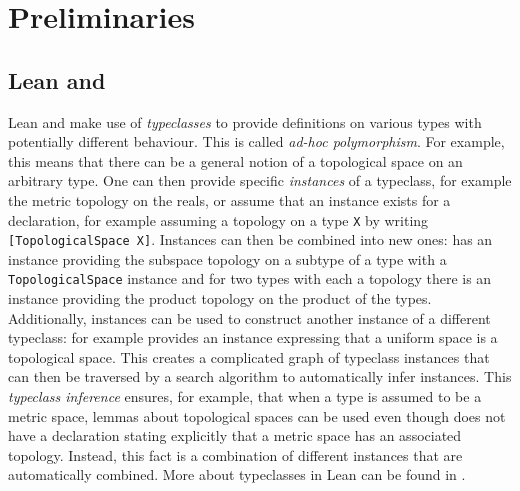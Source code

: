 \section{Preliminaries}

\subsection{Lean and \mathlib}



Lean and \mathlib make use of \emph{typeclasses} to provide definitions on various types with potentially different behaviour. 
This is called \emph{ad-hoc polymorphism}.
For example, this means that there can be a general notion of a topological space on an arbitrary type.
One can then provide specific \emph{instances} of a typeclass, for example the metric topology on the reals, or assume that an instance exists for a declaration, for example assuming a topology on a type \lstinline|X| by writing \lstinline|[TopologicalSpace X]|. 
Instances can then be combined into new ones: 
\mathlib has an instance providing the subspace topology on a subtype of a type with a \lstinline|TopologicalSpace| instance and for two types with each a topology there is an instance providing the product topology on the product of the types. 
Additionally, instances can be used to construct another instance of a different typeclass:
\mathlib for example provides an instance expressing that a uniform space is a topological space. 
This creates a complicated graph of typeclass instances that can then be traversed by a search algorithm to automatically infer instances. 
This \emph{typeclass inference} ensures, for example, that when a type is assumed to be a metric space, lemmas about topological spaces can be used even though \mathlib does not have a declaration stating explicitly that a metric space has an associated topology. 
Instead, this fact is a combination of different instances that are automatically combined. 
More about typeclasses in Lean can be found in \cite{Selsam2020}.

